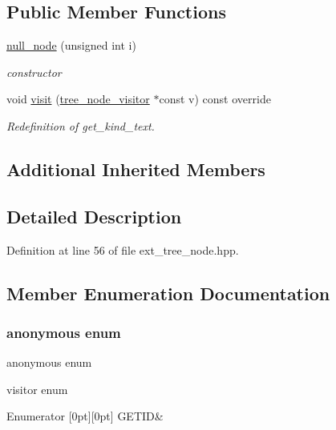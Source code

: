 \subsection*{Public Member Functions}
\begin{DoxyCompactItemize}
\item 
\hyperlink{structnull__node_a767e642f4b60c9d73145229e688d7177}{null\+\_\+node} (unsigned int i)
\begin{DoxyCompactList}\small\item\em constructor \end{DoxyCompactList}\item 
void \hyperlink{structnull__node_a2ca249a9a55f750dad7443b376af929c}{visit} (\hyperlink{classtree__node__visitor}{tree\+\_\+node\+\_\+visitor} $\ast$const v) const override
\begin{DoxyCompactList}\small\item\em Redefinition of get\+\_\+kind\+\_\+text. \end{DoxyCompactList}\end{DoxyCompactItemize}
\subsection*{Additional Inherited Members}


\subsection{Detailed Description}


Definition at line 56 of file ext\+\_\+tree\+\_\+node.\+hpp.



\subsection{Member Enumeration Documentation}
\mbox{\label{structnull__node_a9473c0148b56f703975a2af958325928}} 
\subsubsection{\texorpdfstring{anonymous enum}{anonymous enum}}
{\footnotesize\ttfamily anonymous enum}



visitor enum 

\begin{DoxyEnumFields}{Enumerator}
[0pt][0pt]{}\mbox{\label{structnull__node_a9473c0148b56f703975a2af958325928a79a3bf9c6634c93e7fa168b80eea2d51}} 
G\+E\+T\+ID&\\
\hline

\end{DoxyEnumFields}


